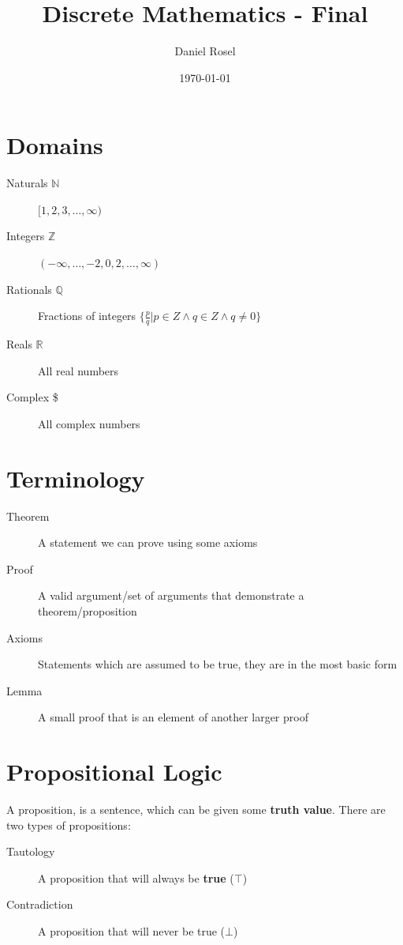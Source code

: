 \documentclass[11pt]{article}
\author{Daniel Rosel}
\date{\today}
\title{Discrete Mathematics - Final}
\begin{document}
\maketitle
\setcounter{tocdepth}{2}
\tableofcontents




\section{Domains}
\label{sec:org7b5b900}
\begin{description}
\item[{Naturals \(\mathbb{N}\)}] \([1,2,3,\ldots,\infty)\)
\item[{Integers \(\mathbb{Z}\)}] \((-\infty,\ldots,-2,0,2,\ldots,\infty)\)
\item[{Rationals \(\mathbb{Q}\)}] Fractions of integers \(\{ \frac{p}{q} \vert p \in Z \land q \in Z \land q \ne 0 \}\)
\item[{Reals \(\mathbb{R}\)}] All real numbers
\item[{Complex \$}] All complex numbers
\end{description}
\section{Terminology}
\label{sec:orgf584ba4}
\begin{description}
\item[{Theorem}] A statement we can prove using some axioms
\item[{Proof}] A valid argument/set of arguments that demonstrate a theorem/proposition
\item[{Axioms}] Statements which are assumed to be true, they are in the most basic form
\item[{Lemma}] A small proof that is an element of another larger proof
\end{description}
\section{Propositional Logic}
\label{sec:org2971812}
A proposition, is a sentence, which can be given some \textbf{truth value}.
There are two types of propositions:
\begin{description}
\item[{Tautology}] A proposition that will always be \textbf{true} (\(\top\))
\item[{Contradiction}] A proposition that will never be true (\(\bot\))
\end{description}
\end{document}
